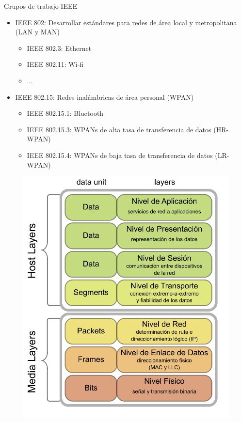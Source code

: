 \documentclass[aspectratio=169, handout]{beamer}
\begin{document}
\begin{frame}{Grupos de trabajo IEEE} 

\begin{minipage}[c]{1.0\linewidth}
	\begin{minipage}[c]{0.6\linewidth}
		\begin{itemize}
			\item IEEE 802: Desarrollar estándares para redes de área local y metropolitana (LAN y MAN)
			\begin{itemize}
				\item IEEE 802.3: Ethernet
				\item IEEE 802.11: Wi-fi
				\item ...
			\end{itemize}
			\vspace{10px}
			\item IEEE 802.15: Redes inalámbricas de área personal (WPAN)
			\vspace{5px}
			\begin{itemize}
				\item IEEE 802.15.1: Bluetooth
				\item IEEE 802.15.3: WPANs de alta tasa de transferencia de datos (HR-WPAN)			
				\item IEEE 802.15.4: WPANs de baja tasa de transferencia de datos (LR-WPAN)
			\end{itemize}
		\end{itemize}
	\end{minipage}
	\begin{minipage}[c]{0.35\linewidth}
		\begin{figure}[H]
			\includegraphics[width=1\textwidth]{./imagenes/OSI_Model_v1.pdf}
		\end{figure}	  	  	
	\end{minipage}
\end{minipage}
	

\end{frame}
\end{document}
